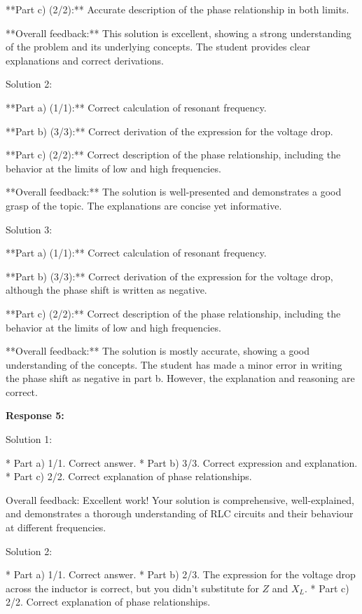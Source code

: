 \documentclass[a4paper,11pt]{article}
\begin{document}
**Part c) (2/2):** Accurate description of the phase relationship in both limits.

**Overall feedback:** This solution is excellent, showing a strong understanding of the problem and its underlying concepts. The student provides clear explanations and correct derivations.

Solution 2:

**Part a) (1/1):** Correct calculation of resonant frequency.

**Part b) (3/3):** Correct derivation of the expression for the voltage drop.

**Part c) (2/2):** Correct description of the phase relationship, including the behavior at the limits of low and high frequencies.

**Overall feedback:** The solution is well-presented and demonstrates a good grasp of the topic. The explanations are concise yet informative.

Solution 3:

**Part a) (1/1):** Correct calculation of resonant frequency.

**Part b) (3/3):** Correct derivation of the expression for the voltage drop, although the phase shift is written as negative.

**Part c) (2/2):** Correct description of the phase relationship, including the behavior at the limits of low and high frequencies.

**Overall feedback:** The solution is mostly accurate, showing a good understanding of the concepts. The student has made a minor error in writing the phase shift as negative in part b. However, the explanation and reasoning are correct.

\bigskip    
\textbf{Response 5:}

Solution 1:

*   Part a) 1/1. Correct answer.
*   Part b) 3/3. Correct expression and explanation.
*   Part c) 2/2. Correct explanation of phase relationships.

Overall feedback: Excellent work! Your solution is comprehensive, well-explained, and demonstrates a thorough understanding of RLC circuits and their behaviour at different frequencies. 

Solution 2:

*   Part a) 1/1. Correct answer.
*   Part b) 2/3. The expression for the voltage drop across the inductor is correct, but you didn't substitute for $Z$ and $X_L$.
*   Part c) 2/2. Correct explanation of phase relationships.
\end{document}
